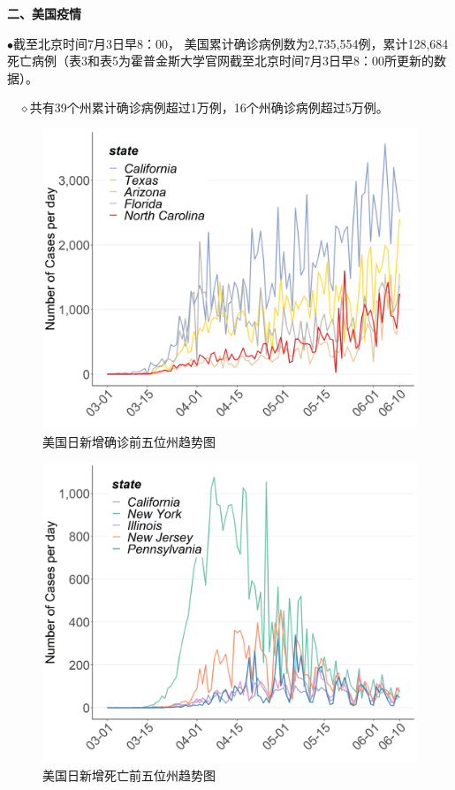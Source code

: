 \documentclass[
]{article}
\begin{document}
\begin{huge}{\textcolor{glaucous}{\textbf {二、美国疫情}}}\end{huge}

\vspace{-5mm}

\(\bullet\)截至北京时间7月3日早8：00，
美国累计确诊病例数为2,735,554例，累计128,684死亡病例（表3和表5为霍普金斯大学官网截至北京时间7月3日早8：00所更新的数据）。

\(\quad\)\(\diamond\)共有39个州累计确诊病例超过1万例，16个州确诊病例超过5万例。

\begin{figure}[H]
\centering
{}
\caption{美国日新增确诊前五位州趋势图}
\includegraphics[]{./input/covid5.png}
\end{figure}

\begin{figure}[H]
\centering
{}
\caption{美国日新增死亡前五位州趋势图}
\includegraphics[]{./input/covid6.png}
\end{figure}
\end{document}
